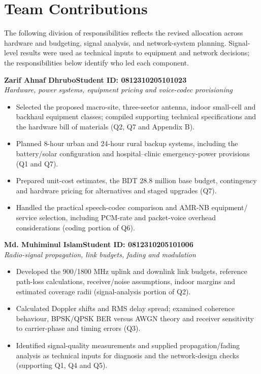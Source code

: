 \documentclass[9pt,a4paper]{extarticle}
\begin{document}
\clearpage
\section{Team Contributions}
\label{app:team}

The following division of responsibilities reflects the revised allocation
across hardware and budgeting, signal analysis, and network-system planning.
Signal-level results were used as technical inputs to equipment and network
decisions; the responsibilities below identify who led each component.

\vspace{4pt}
\noindent\textbf{Zarif Ahnaf Dhrubo}\hfill\textbf{Student ID: 0812310205101023}\\[-1pt]
\textit{Hardware, power systems, equipment pricing and voice-codec provisioning}
\begin{itemize}[leftmargin=1.5em,topsep=3pt,itemsep=1.5pt,parsep=0pt]
  \item Selected the proposed macro-site, three-sector antenna, indoor small-cell
  and backhaul equipment classes; compiled supporting technical specifications
  and the hardware bill of materials (Q2, Q7 and Appendix B).
  \item Planned 8-hour urban and 24-hour rural backup systems, including the
  battery/solar configuration and hospital--clinic emergency-power provisions
  (Q1 and Q7).
  \item Prepared unit-cost estimates, the BDT 28.8 million base budget,
  contingency and hardware pricing for alternatives and staged upgrades (Q7).
  \item Handled the practical speech-codec comparison and AMR-NB equipment/
  service selection, including PCM-rate and packet-voice overhead considerations
  (coding portion of Q6).
\end{itemize}

\vspace{4pt}
\noindent\textbf{Md. Muhiminul Islam}\hfill\textbf{Student ID: 0812310205101006}\\[-1pt]
\textit{Radio-signal propagation, link budgets, fading and modulation}
\begin{itemize}[leftmargin=1.5em,topsep=3pt,itemsep=1.5pt,parsep=0pt]
  \item Developed the 900/1800 MHz uplink and downlink link budgets, reference
  path-loss calculations, receiver/noise assumptions, indoor margins and
  estimated coverage radii (signal-analysis portion of Q2).
  \item Calculated Doppler shifts and RMS delay spread; examined coherence
  behaviour, BPSK/QPSK BER versus AWGN theory and receiver sensitivity to
  carrier-phase and timing errors (Q3).
  \item Identified signal-quality measurements and supplied propagation/fading
  analysis as technical inputs for diagnosis and the network-design checks
  (supporting Q1, Q4 and Q5).
\end{itemize}
\end{document}
